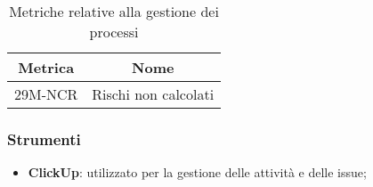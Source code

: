 \begin{table}[h]
	\centering
	\begin{tabular}{|c|c|}
		\hline
		\textbf{Metrica} & \textbf{Nome}        \\
		\hline
		29M-NCR          & Rischi non calcolati \\
		\hline
	\end{tabular}
	\caption{Metriche relative alla gestione dei processi}
\end{table}

\subsubsection{Strumenti}
\begin{itemize}
	\item \textbf{ClickUp}: utilizzato per la gestione delle attività e delle issue;
\end{itemize}
